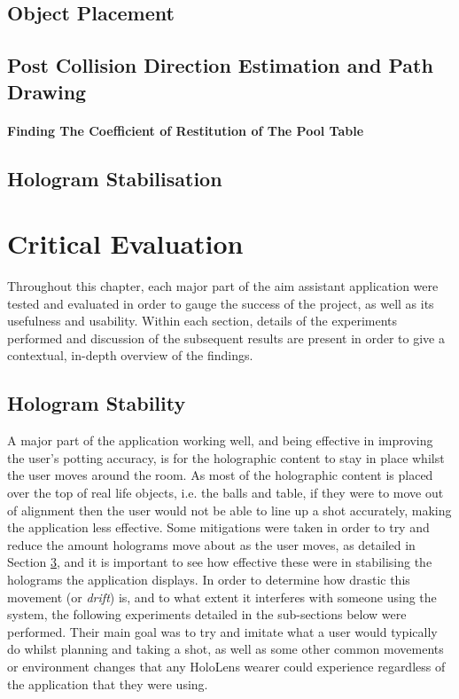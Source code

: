 \documentclass[ %
                author={Finn Alexander Wilkinson},
                supervisor={Dr. Andrew Calway},
                degree={MEng},
                title={\centering A Mixed Reality Aim Assistant for Pool and Snooker},
                subtitle={},
                type={Enterprise},
                year={2021} ]{dissertation}
\begin{document}
\section{Object Placement}
\label{exec:objectPlacement}

\section{Post Collision Direction Estimation and Path Drawing}
\label{exec:collisionPath}
\subsubsection{Finding The Coefficient of Restitution of The Pool Table}

\section{Hologram Stabilisation}
\label{exec:holoStabilisation}



\chapter{Critical Evaluation}
\label{chap:evaluation}

Throughout this chapter, each major part of the aim assistant application were tested and evaluated in order to gauge the success of the project, as well as its usefulness and usability. Within each section, details of the experiments performed and discussion of the subsequent results are present in order to give a contextual, in-depth overview of the findings.

\section{Hologram Stability}
\label{eval:stability}

A major part of the application working well, and being effective in improving the user's potting accuracy, is for the holographic content to stay in place whilst the user moves around the room. As most of the holographic content is placed over the top of real life objects, i.e. the balls and table, if they were to move out of alignment then the user would not be able to line up a shot accurately, making the application less effective.
Some mitigations were taken in order to try and reduce the amount holograms move about as the user moves, as detailed in Section \ref{exec:holoStabilisation}, and it is important to see how effective these were in stabilising the holograms the application displays. In order to determine how drastic this movement (or \textit{drift}) is, and to what extent it interferes with someone using the system, the following experiments detailed in the sub-sections below were performed. Their main goal was to try and imitate what a user would typically do whilst planning and taking a shot, as well as some other common movements or environment changes that any HoloLens wearer could experience regardless of the application that they were using. \\
\end{document}
